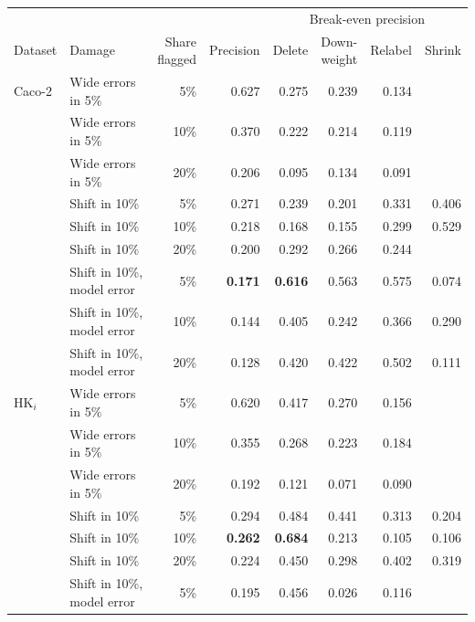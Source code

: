 \begin{table}[htbp]
\centering
\begin{tabular}{@{}llrrrrrr@{}}
\toprule
 & & & & \multicolumn{4}{c}{Break-even precision} \\
\cmidrule(l){5-8}
Dataset & Damage & \makecell[r]{Share\\flagged} & Precision & Delete & \makecell[r]{Down-\\weight} & Relabel & Shrink \\
\midrule
Caco-2 & Wide errors in 5\% & 5\% & 0.627 & 0.275 & 0.239 & 0.134 &  \\
 & Wide errors in 5\% & 10\% & 0.370 & 0.222 & 0.214 & 0.119 &  \\
 & Wide errors in 5\% & 20\% & 0.206 & 0.095 & 0.134 & 0.091 &  \\
 & Shift in 10\% & 5\% & 0.271 & 0.239 & 0.201 & 0.331 & 0.406 \\
 & Shift in 10\% & 10\% & 0.218 & 0.168 & 0.155 & 0.299 & 0.529 \\
 & Shift in 10\% & 20\% & 0.200 & 0.292 & 0.266 & 0.244 &  \\
 & \makecell[l]{Shift in 10\%,\\model error} &5\% & \textbf{0.171} & \textbf{0.616} & 0.563 & 0.575 & 0.074 \\
 & \makecell[l]{Shift in 10\%,\\model error} &10\% & 0.144 & 0.405 & 0.242 & 0.366 & 0.290 \\
 & \makecell[l]{Shift in 10\%,\\model error} &20\% & 0.128 & 0.420 & 0.422 & 0.502 & 0.111 \\
HK$_i$ & Wide errors in 5\% & 5\% & 0.620 & 0.417 & 0.270 & 0.156 &  \\
 & Wide errors in 5\% & 10\% & 0.355 & 0.268 & 0.223 & 0.184 &  \\
 & Wide errors in 5\% & 20\% & 0.192 & 0.121 & 0.071 & 0.090 &  \\
 & Shift in 10\% & 5\% & 0.294 & 0.484 & 0.441 & 0.313 & 0.204 \\
 & Shift in 10\% & 10\% & \textbf{0.262} & \textbf{0.684} & 0.213 & 0.105 & 0.106 \\
 & Shift in 10\% & 20\% & 0.224 & 0.450 & 0.298 & 0.402 & 0.319 \\
 & \makecell[l]{Shift in 10\%,\\model error} &5\% & 0.195 & 0.456 & 0.026 & 0.116 &  \\

\end{tabular}
\end{table}
